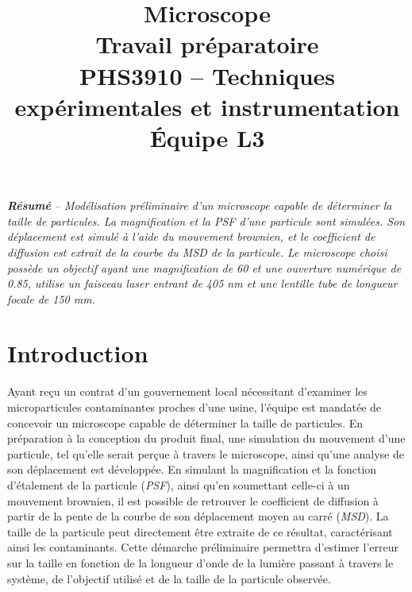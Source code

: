 \documentclass[conference]{IEEEtran}
\begin{document}
\title{Microscope\\
\large Travail préparatoire \\
PHS3910 -- Techniques expérimentales et instrumentation\\ 
Équipe L3}

\author{
\and
{}
\and
{}
\and
{}
}

\maketitle

\textit{\textbf{Résumé} -- Modélisation préliminaire d'un microscope capable de déterminer la taille de 
particules. La magnification et la PSF d'une particule sont simulées. Son déplacement est simulé à l'aide du
mouvement brownien, et le coefficient de diffusion est extrait de la courbe du MSD de la particule. Le microscope choisi 
possède un objectif ayant une magnification de 60 et une ouverture numérique de 0.85, utilise un faisceau laser entrant de 405 nm et une lentille tube
de longueur focale de 150 mm.}
\section{Introduction}
Ayant reçu un contrat d'un gouvernement local nécessitant d'examiner les microparticules contaminantes proches d'une
usine, l'équipe est mandatée de concevoir un microscope capable de déterminer la taille de particules. En préparation à la conception
du produit final, une simulation du mouvement d'une particule, tel qu'elle serait perçue à travers le microscope, ainsi qu'une
analyse de son déplacement est développée. En simulant la magnification et la fonction d'étalement de la particule (\textit{PSF}), ainsi qu'en soumettant
celle-ci à un mouvement brownien, il est possible
de retrouver le coefficient de diffusion à partir de la pente de la courbe de son déplacement moyen au carré (\textit{MSD}).
La taille de la particule peut directement être extraite de ce résultat, caractérisant ainsi les contaminants. Cette démarche préliminaire permettra
d'estimer l'erreur sur la taille en fonction de la longueur d'onde de la lumière passant à travers le système, de l'objectif utilisé et de la 
taille de la particule observée.
\end{document}
